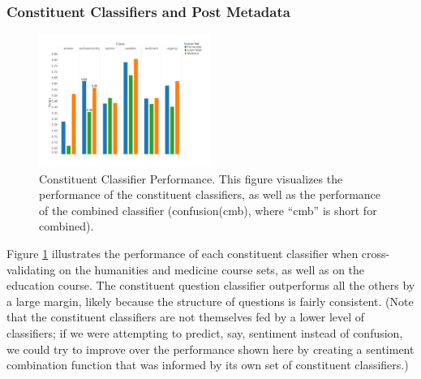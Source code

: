 \documentclass{edm_template}
\begin{document}
\subsubsection{Constituent Classifiers and Post Metadata}

\begin{figure}
\vspace{-18pt}
       \centering
       \includegraphics[width=0.5\textwidth]{../Figs/classifierEvalsWithEdu.pdf}
       \vspace{-30pt}
       \caption{\textnormal{Constituent Classifier Performance. This figure visualizes the performance of the constituent classifiers, as well as the performance of the combined classifier (confusion(cmb), where ``cmb'' is short for combined).}}
      \label{figure:constituents}
\end{figure}

Figure \ref{figure:constituents} illustrates the performance of each constituent classifier when cross-validating on the humanities and medicine course sets, as well as on the education course. The constituent question classifier outperforms all the others by a large margin, likely because the structure of questions is fairly consistent. (Note that the constituent classifiers are not themselves fed by a lower level of classifiers; if we were attempting to predict, say, sentiment instead of confusion, we could try to improve over the performance shown here by creating a sentiment combination function that was informed by its own set of constituent classifiers.)
\end{document}
